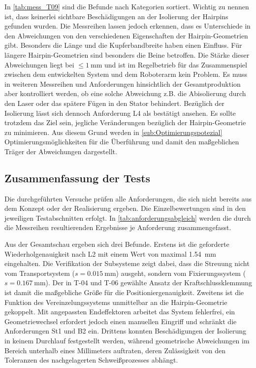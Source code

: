 In \cref{tab:mess_T09} sind die Befunde nach Kategorien sortiert. Wichtig zu nennen ist, dass keinerlei sichtbare Beschädigungen
an der Isolierung der Hairpins gefunden wurden. Die Messreihen lassen jedoch erkennen, dass es Unterschiede in den Abweichungen
von den verschiedenen Eigenschaften der Hairpin-Geometrien gibt. Besonders die Länge und die Kupferbandbreite haben einen Einfluss. Für längere
Hairpin-Geometrien sind besonders die Beine betroffen. Die Stärke dieser Abweichungen liegt
bei ${\leq}\qty{1}{\milli\meter}$ und ist im Regelbetrieb für das Zusammenspiel zwischen dem entwickelten System und dem Roboterarm
kein Problem. Es muss in weiteren Messreihen und Anforderungen hinsichtlich der Gesamtproduktion aber kontrolliert werden,
ob eine solche Abweichung z.B. die Abisolierung durch den Laser oder das spätere Fügen in den Stator behindert. Bezüglich der 
Isolierung lässt sich dennoch Anforderung L4 als bestätigt ansehen. Es sollte trotzdem das Ziel sein, jegliche Veränderungen
bezüglich der Hairpin-Geometrie zu minimieren. Aus diesem Grund werden in \cref{sub:Optimierungspotezial} Optimierungsmöglichkeiten
für die Überführung und damit den maßgeblichen Träger der Abweichungen dargestellt.

\subsection{Zusammenfassung der Tests}\label{sec:Testbewertung}
Die durchgeführten Versuche prüfen alle Anforderungen, die sich nicht bereits
aus dem Konzept oder der Realisierung ergeben. Die Einzelbewertungen sind in den
jeweiligen Testabschnitten erfolgt. In \cref{tab:anforderungsabgleich} werden die durch die Messreihen
resultierenden Ergebnisse je Anforderung zusammengefasst.

Aus der Gesamtschau ergeben sich drei Befunde. Erstens ist die geforderte
Wiederholgenauigkeit nach L2 mit einem Wert von maximal
\qty{1.54}{\milli\meter} eingehalten. 
Die Verifikation der Subsysteme zeigt dabei, dass die Streuung nicht vom
Transportsystem ($s = \qty{0.015}{\milli\meter}$) ausgeht, sondern vom
Fixierungssystem ($s = \qty{0.167}{\milli\meter}$). Der in T-04 und T-06
gewählte Ansatz der Kraftschlussklemmung ist damit die maßgebliche Größe für
die Positioniergenauigkeit. Zweitens ist die Funktion des Vereinzelungssystems
unmittelbar an die Hairpin-Geometrie gekoppelt. Mit angepassten Endeffektoren
arbeitet das System fehlerfrei, ein Geometriewechsel erfordert jedoch einen
manuellen Eingriff und schränkt die Anforderungen St1 und B2 ein. Drittens
konnten Beschädigungen der Isolierung in keinem Durchlauf festgestellt werden,
während geometrische Abweichungen im Bereich unterhalb eines Millimeters
auftraten, deren Zulässigkeit von den Toleranzen des nachgelagerten
Schweißprozesses abhängt.

